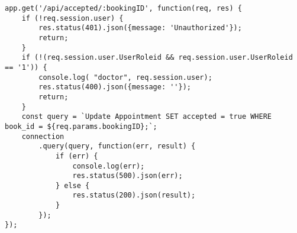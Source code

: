 \begin{itemize}
\begin{verbatim}
app.get('/api/accepted/:bookingID', function(req, res) {
    if (!req.session.user) {
        res.status(401).json({message: 'Unauthorized'});
        return;
    }
    if (!(req.session.user.UserRoleid && req.session.user.UserRoleid == '1')) {
        console.log( "doctor", req.session.user);
        res.status(400).json({message: ''});
        return;
    }
    const query = `Update Appointment SET accepted = true WHERE book_id = ${req.params.bookingID};`;
    connection
        .query(query, function(err, result) {
            if (err) {
                console.log(err);
                res.status(500).json(err);
            } else {
                res.status(200).json(result);
            }
        });
});
    \end{verbatim}
\end{itemize}



